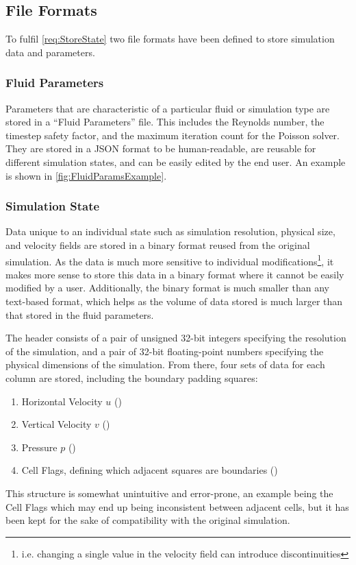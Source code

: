 \subsection{File Formats}\label{sec:FileFormat}
To fulfil \cref{req:StoreState} two file formats have been defined to store simulation data and parameters.

\subsubsection{Fluid Parameters}
Parameters that are characteristic of a particular fluid or simulation type are stored in a ``Fluid Parameters'' file.
This includes the Reynolds number, the timestep safety factor, and the maximum iteration count for the Poisson solver.
They are stored in a JSON format to be human-readable, are reusable for different simulation states, and can be easily edited by the end user.
An example is shown in \cref{fig:FluidParamsExample}.



\subsubsection{Simulation State}
Data unique to an individual state such as simulation resolution, physical size, and velocity fields are stored in a binary format reused from the original simulation.
As the data is much more sensitive to individual modifications\footnote{i.e. changing a single value in the velocity field can introduce discontinuities}, it makes more sense to store this data in a binary format where it cannot be easily modified by a user.
Additionally, the binary format is much smaller than any text-based format, which helps as the volume of data stored is much larger than that stored in the fluid parameters.

The header consists of a pair of unsigned 32-bit integers specifying the resolution of the simulation, and a pair of 32-bit floating-point numbers specifying the physical dimensions of the simulation.
From there, four sets of data for each column are stored, including the boundary padding squares:
\begin{enumerate}
    \item Horizontal Velocity $u$ ()
    \item Vertical Velocity $v$ ()
    \item Pressure $p$ ()
    \item Cell Flags, defining which adjacent squares are boundaries ()
\end{enumerate}
This structure is somewhat unintuitive and error-prone, an example being the Cell Flags which may end up being inconsistent between adjacent cells, but it has been kept for the sake of compatibility with the original simulation.
